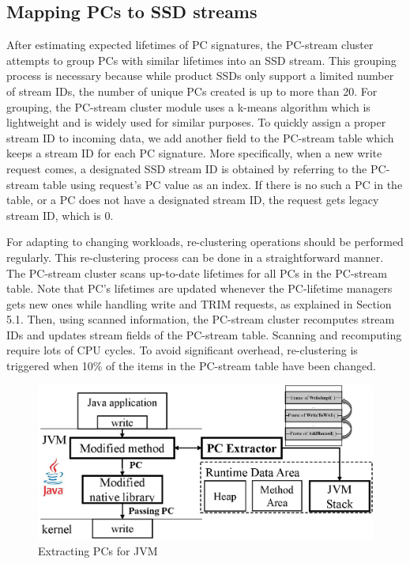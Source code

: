 \subsection{Mapping PCs to SSD streams}

After estimating expected lifetimes of PC signatures, the PC-stream cluster
attempts to group PCs with similar lifetimes into an SSD stream.  This grouping
process is necessary because while product SSDs only support a limited number
of stream IDs, the number of unique PCs created is up to more than 20.  
For grouping, the PC-stream cluster module uses a k-means
algorithm which is lightweight and is widely used for similar purposes.  To
quickly assign a proper stream ID to incoming data, we add another field to the
PC-stream table which keeps a stream ID for each PC signature.  More
specifically, when a new write request comes, a designated SSD stream ID is
obtained by referring to the PC-stream table using request's PC value as an
index.  If there is no such a PC in the table, or a PC does not have a
designated stream ID, the request gets legacy stream ID, which is 0.

For adapting to changing workloads, re-clustering operations should be
performed regularly. This re-clustering process can be done in a
straightforward manner. The PC-stream cluster scans up-to-date lifetimes for
all PCs in the PC-stream table. Note that PC's lifetimes are updated whenever
the PC-lifetime managers gets new ones while handling write and TRIM requests,
as explained in Section 5.1.  Then, using scanned information, the PC-stream
cluster recomputes stream IDs and updates stream fields of the PC-stream table.
Scanning and recomputing require lots of CPU cycles.  To avoid significant
overhead, re-clustering is triggered when 10\% of the items in the PC-stream
table have been changed.



\begin{figure}[t]
\centering
	\includegraphics[width=0.8\linewidth]{figure/jvmpc}
	\caption{
	Extracting PCs for JVM
	}
\label{fig:java}
\end{figure}


